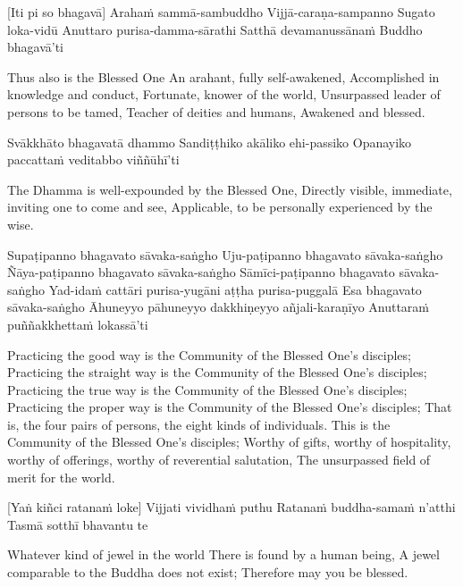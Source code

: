 \begin{english}
\begin{english}
\suttaRef{[AN 4.67]}

[Iti pi so bhagavā]
Arahaṁ sammā-sambuddho
Vijjā-caraṇa-sampanno
Sugato loka-vidū
Anuttaro purisa-damma-sārathi
Satthā devamanussānaṁ
Buddho bhagavā’ti

\begin{english}
Thus also is the Blessed One
An arahant, fully self-awakened,
Accomplished in knowledge and conduct,
Fortunate, knower of the world,
Unsurpassed leader of persons to be tamed,
Teacher of deities and humans,
Awakened and blessed.
\end{english}

Svākkhāto bhagavatā dhammo
Sandiṭṭhiko akāliko ehi-passiko
Opanayiko paccattaṁ veditabbo viññūhī’ti

\begin{english}
The Dhamma is well-expounded by the Blessed One,
Directly visible, immediate, inviting one to come and see,
Applicable, to be personally experienced by the wise.
\end{english}

Supaṭipanno bhagavato sāvaka-saṅgho
Uju-paṭipanno bhagavato sāvaka-saṅgho
Ñāya-paṭipanno bhagavato sāvaka-saṅgho
Sāmīci-paṭipanno bhagavato sāvaka-saṅgho
Yad-idaṁ cattāri purisa-yugāni aṭṭha purisa-puggalā
Esa bhagavato sāvaka-saṅgho
Āhuneyyo pāhuneyyo dakkhiṇeyyo añjali-karaṇīyo
Anuttaraṁ puññakkhettaṁ lokassā’ti

\begin{english}
Practicing the good way is the Community of the Blessed One’s disciples;
Practicing the straight way is the Community of the Blessed One’s disciples;
Practicing the true way is the Community of the Blessed One’s disciples;
Practicing the proper way is the Community of the Blessed One’s disciples;
That is, the four pairs of persons, the eight kinds of individuals.
This is the Community of the Blessed One’s disciples;
Worthy of gifts, worthy of hospitality, worthy of offerings, worthy of reverential salutation,
The unsurpassed field of merit for the world.
\end{english}

\suttaRef{[SN 11.3]}

[Yaṅ kiñci ratanaṁ loke]
Vijjati vividhaṁ puthu
Ratanaṁ buddha-samaṁ n’atthi
Tasmā sotthī bhavantu te

\begin{english}
Whatever kind of jewel in the world
There is found by a human being,
A jewel comparable to the Buddha does not exist;
Therefore may you be blessed.
\end{english}


\end{english}
\end{english}
